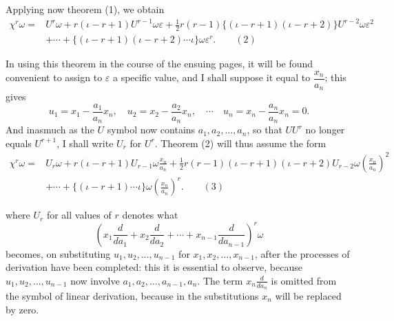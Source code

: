 \documentclass[11pt]{article}
\newcommand{\sourcepage}[1]{\marginpar{\scriptsize p.~#1}}
\newcommand{\eps}{\varepsilon}
\begin{document}
{{Applying now theorem (1), we obtain
\[
\begin{aligned}
\chi^r\omega={}&U^r\omega+r(\iota-r+1)U^{r-1}\omega\eps
+\tfrac12 r(r-1)\{(\iota-r+1)(\iota-r+2)\}U^{r-2}\omega\eps^2\\
&+\cdots+\{(\iota-r+1)(\iota-r+2)\cdots\iota\}\omega\eps^r.\qquad(2)
\end{aligned}
\]

In using this theorem in the course of the ensuing pages, it will be found convenient to assign to $\eps$ a specific value, and I shall suppose it equal to $\dfrac{x_n}{a_n}$; this gives
\[
 u_1=x_1-\frac{a_1}{a_n}x_n,
 \quad
 u_2=x_2-\frac{a_2}{a_n}x_n,
 \quad\cdots\quad
 u_n=x_n-\frac{a_n}{a_n}x_n=0.
\]
And inasmuch as the $U$ symbol now contains $a_1,a_2,\ldots,a_n$, so that $UU^r$ no longer equals $U^{r+1}$, I shall write $U_r$ for $U^r$. Theorem (2) will thus assume the form
\[
\begin{aligned}
\chi^r\omega={}&U_r\omega+r(\iota-r+1)U_{r-1}\omega\frac{x_n}{a_n}
+\tfrac12 r(r-1)(\iota-r+1)(\iota-r+2)U_{r-2}\omega\left(\frac{x_n}{a_n}\right)^2\\
&+\cdots+\{(\iota-r+1)\cdots\iota\}\omega\left(\frac{x_n}{a_n}\right)^r.\qquad(3)
\end{aligned}
\]

\sourcepage{167}
where $U_r$ for all values of $r$ denotes what
\[
\left(x_1\frac{d}{da_1}+x_2\frac{d}{da_2}+\cdots+x_{n-1}\frac{d}{da_{n-1}}\right)^r\omega
\]
becomes, on substituting $u_1,u_2,\ldots,u_{n-1}$ for $x_1,x_2,\ldots,x_{n-1}$, after the processes of derivation have been completed: this it is essential to observe, because $u_1,u_2,\ldots,u_{n-1}$ now involve $a_1,a_2,\ldots,a_{n-1},a_n$. The term $x_n\frac{d}{da_n}$ is omitted from the symbol of linear derivation, because in the substitutions $x_n$ will be replaced by zero.

}}
\end{document}
